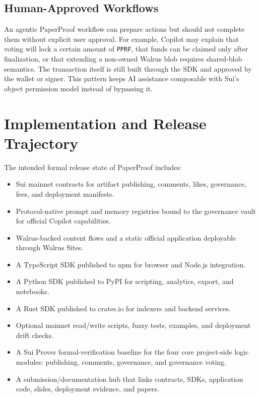 \documentclass[journal]{IEEEtran}
\newcommand{\pprf}{\texttt{PPRF}}
\begin{document}
\subsection{Human-Approved Workflows}

An agentic PaperProof workflow can prepare actions but should not complete them without explicit user approval. For example, Copilot may explain that voting will lock a certain amount of \pprf{}, that funds can be claimed only after finalization, or that extending a non-owned Walrus blob requires shared-blob semantics. The transaction itself is still built through the SDK and approved by the wallet or signer. This pattern keeps AI assistance composable with Sui's object permission model instead of bypassing it.

\section{Implementation and Release Trajectory}

The intended formal release state of PaperProof includes:

\begin{itemize}
    \item Sui mainnet contracts for artifact publishing, comments, likes, governance, fees, and deployment manifests.
    \item Protocol-native prompt and memory registries bound to the governance vault for official Copilot capabilities.
    \item Walrus-backed content flows and a static official application deployable through Walrus Sites.
    \item A TypeScript SDK published to npm for browser and Node.js integration.
    \item A Python SDK published to PyPI for scripting, analytics, export, and notebooks.
    \item A Rust SDK published to crates.io for indexers and backend services.
    \item Optional mainnet read/write scripts, fuzzy tests, examples, and deployment drift checks.
    \item A Sui Prover formal-verification baseline for the four core
    project-side logic modules: publishing, comments, governance, and
    governance voting.
    \item A submission/documentation hub that links contracts, SDKs, application code, slides, deployment evidence, and papers.
\end{itemize}
\end{document}
